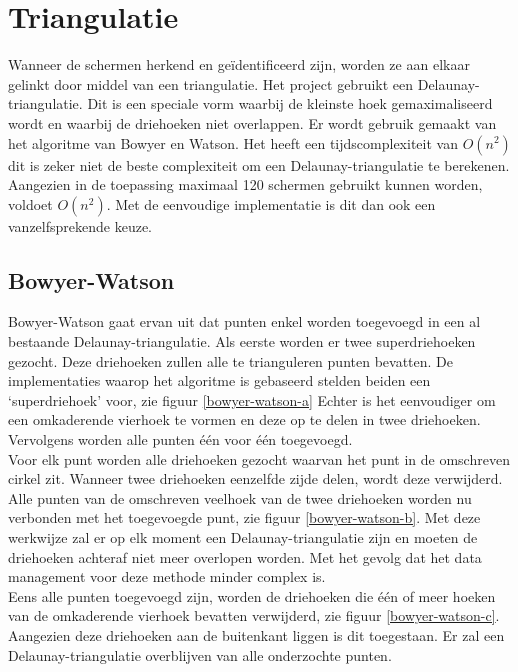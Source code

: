 \section{Triangulatie} \label{sec:triangulatie}
Wanneer de schermen herkend en geïdentificeerd zijn, worden ze aan elkaar gelinkt door middel van een triangulatie. Het project gebruikt een Delaunay-triangulatie. Dit is een speciale vorm waarbij de kleinste hoek gemaximaliseerd wordt en waarbij de driehoeken niet overlappen. \cite{delaunaywiki}
Er wordt gebruik gemaakt van het algoritme van Bowyer en Watson. \cite{Bowyer-WatsonWiki} Het heeft een tijdscomplexiteit van $O(n^2)$ dit is zeker niet de beste complexiteit om een Delaunay-triangulatie te berekenen. Aangezien in de toepassing maximaal 120 schermen gebruikt kunnen worden, voldoet $O(n^2)$. Met de eenvoudige implementatie is dit dan ook een vanzelfsprekende keuze.

\subsection{Bowyer-Watson}
Bowyer-Watson gaat ervan uit dat punten enkel worden toegevoegd in een al bestaande Delaunay-triangulatie. Als eerste worden er twee superdriehoeken gezocht. Deze driehoeken zullen alle te trianguleren punten bevatten. De implementaties waarop het algoritme is gebaseerd \cite{Bowyer-WatsonWiki} \cite{bowyer-watsonImplementation} stelden beiden een `superdriehoek' voor, zie figuur \ref{bowyer-watson-a} Echter is het eenvoudiger om een omkaderende vierhoek te vormen en deze op te delen in twee driehoeken. Vervolgens worden alle punten één voor één toegevoegd.\\[3mm]
Voor elk punt worden alle driehoeken gezocht waarvan het punt in de omschreven cirkel zit. Wanneer twee driehoeken eenzelfde zijde delen, wordt deze verwijderd. Alle punten van de omschreven veelhoek van de twee driehoeken worden nu verbonden met het toegevoegde punt, zie figuur \ref{bowyer-watson-b}. Met deze werkwijze zal er op elk moment een Delaunay-triangulatie zijn en moeten de driehoeken achteraf niet meer overlopen worden. Met het gevolg dat het data management voor deze methode minder complex is.\\[3mm]
Eens alle punten toegevoegd zijn, worden de driehoeken die één of meer hoeken van de omkaderende vierhoek bevatten verwijderd, zie figuur \ref{bowyer-watson-c}. Aangezien deze driehoeken aan de buitenkant liggen is dit toegestaan. Er zal een Delaunay-triangulatie overblijven van alle onderzochte punten.

